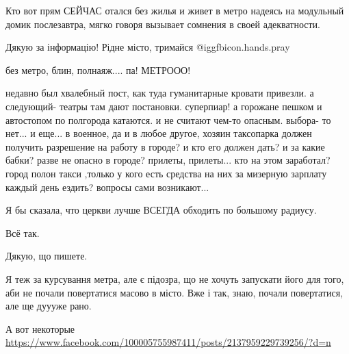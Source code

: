 \begin{itemize}
\begin{itemize}
Кто вот прям СЕЙЧАС отался без жилья и живет в метро надеясь на модульный домик
послезавтра, мягко говоря вызывает сомнения в своей адекватности.

\end{itemize} %

Дякую за інформацію! Рідне місто, тримайся @igg{fbicon.hands.pray} 

без метро, блин, полнаяж.... па! МЕТРООО!


недавно был хвалебный пост, как туда гуманитарные кровати привезли. а следующий-
театры там дают постановки. суперпиар! а горожане пешком и автостопом по
полгорода катаются. и не считают чем-то опасным. выбора- то нет... и еще... в
военное, да и в любое другое, хозяин таксопарка должен получить разрешение на
работу в городе? и кто его должен дать? и за какие бабки? разве не опасно в
городе? прилеты, прилеты... кто на этом заработал? город полон такси ,только у
кого есть средства на них за мизерную зарплату каждый день ездить? вопросы сами
возникают...

Я бы сказала, что церкви лучше ВСЕГДА обходить по большому радиусу.

Всё так.

Дякую, що пишете.


Я теж за курсування метра, але є підозра, що не хочуть запускати його для того,
аби не почали повертатися масово в місто. Вже і так, знаю, почали повертатися,
але ще дуууже рано.

А вот некоторые \url{https://www.facebook.com/100005755987411/posts/2137959229739256/?d=n}

\end{itemize} %
